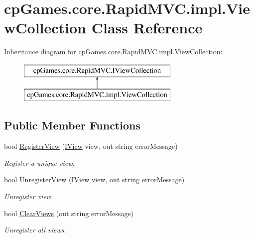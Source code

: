 \hypertarget{classcp_games_1_1core_1_1_rapid_m_v_c_1_1impl_1_1_view_collection}{}\section{cp\+Games.\+core.\+Rapid\+M\+V\+C.\+impl.\+View\+Collection Class Reference}
\label{classcp_games_1_1core_1_1_rapid_m_v_c_1_1impl_1_1_view_collection}
Inheritance diagram for cp\+Games.\+core.\+Rapid\+M\+V\+C.\+impl.\+View\+Collection\+:\begin{figure}[H]
\begin{center}
\leavevmode
\includegraphics[height=2.000000cm]{classcp_games_1_1core_1_1_rapid_m_v_c_1_1impl_1_1_view_collection}
\end{center}
\end{figure}
\subsection*{Public Member Functions}
\begin{DoxyCompactItemize}
\item 
bool \mbox{\hyperlink{classcp_games_1_1core_1_1_rapid_m_v_c_1_1impl_1_1_view_collection_a654222e061d5dc730992cbc0aa519205}{Register\+View}} (\mbox{\hyperlink{interfacecp_games_1_1core_1_1_rapid_m_v_c_1_1_i_view}{I\+View}} view, out string error\+Message)
\begin{DoxyCompactList}\small\item\em Register a unique view. \end{DoxyCompactList}\item 
bool \mbox{\hyperlink{classcp_games_1_1core_1_1_rapid_m_v_c_1_1impl_1_1_view_collection_a5a88bea4fa82d3422364a2e6ba81e1ca}{Unregister\+View}} (\mbox{\hyperlink{interfacecp_games_1_1core_1_1_rapid_m_v_c_1_1_i_view}{I\+View}} view, out string error\+Message)
\begin{DoxyCompactList}\small\item\em Unregister view. \end{DoxyCompactList}\item 
bool \mbox{\hyperlink{classcp_games_1_1core_1_1_rapid_m_v_c_1_1impl_1_1_view_collection_a958ac198eae02d710e3abe17aed90205}{Clear\+Views}} (out string error\+Message)
\begin{DoxyCompactList}\small\item\em Unregister all views. \end{DoxyCompactList}\end{DoxyCompactItemize}
